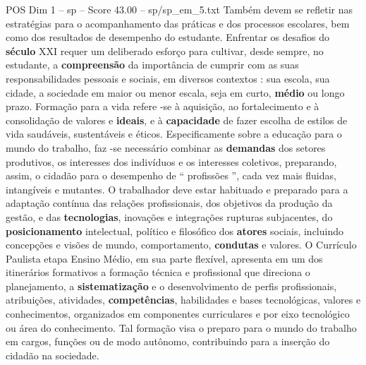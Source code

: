 \begin{textsample}{POS Dim 1 – sp – Score 43.00 – sp/sp\_em\_5.txt}
Também devem se refletir nas estratégias para o acompanhamento das práticas e dos processos escolares, bem como dos resultados de desempenho do estudante.
Enfrentar os desafios do \textbf{século} XXI requer um deliberado esforço para cultivar, desde sempre, no estudante, a \textbf{compreensão} da importância de cumprir com as suas responsabilidades pessoais e sociais, em diversos contextos : sua escola, sua cidade, a sociedade em maior ou menor escala, seja em curto, \textbf{médio} ou longo prazo.
Formação para a vida refere -se à aquisição, ao fortalecimento e à consolidação de valores e \textbf{ideais}, e à \textbf{capacidade} de fazer escolha de estilos de vida saudáveis, sustentáveis e éticos.
Especificamente sobre a educação para o mundo do trabalho, faz -se necessário combinar as \textbf{demandas} dos setores produtivos, os interesses dos indivíduos e os interesses coletivos, preparando, assim, o cidadão para o desempenho de “ profissões ”, cada vez mais fluidas, intangíveis e mutantes.
O trabalhador deve estar habituado e preparado para a adaptação contínua das relações profissionais, dos objetivos da produção da gestão, e das \textbf{tecnologias}, inovações e integrações rupturas subjacentes, do \textbf{posicionamento} intelectual, político e filosófico dos \textbf{atores} sociais, incluindo concepções e visões de mundo, comportamento, \textbf{condutas} e valores.
O Currículo Paulista etapa Ensino Médio, em sua parte flexível, apresenta em um dos itinerários formativos a formação técnica e profissional que direciona o planejamento, a \textbf{sistematização} e o desenvolvimento de perfis profissionais, atribuições, atividades, \textbf{competências}, habilidades e bases tecnológicas, valores e conhecimentos, organizados em componentes curriculares e por eixo tecnológico ou área do conhecimento.
Tal formação visa o preparo para o mundo do trabalho em cargos, funções ou de modo autônomo, contribuindo para a inserção do cidadão na sociedade.

\end{textsample}
